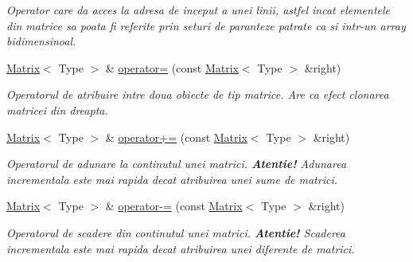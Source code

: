 \begin{DoxyCompactItemize}
\begin{DoxyCompactList}\small\item\em Operator care da acces la adresa de inceput a unei linii, astfel incat elementele din matrice sa poata fi referite prin seturi de paranteze patrate ca si intr-\/un array bidimensinoal. \end{DoxyCompactList}\item 
\hyperlink{classMatrix}{Matrix}$<$ Type $>$ \& \hyperlink{classMatrix_a1a1add9519f7b0665d7521d02ec812e8}{operator=} (const \hyperlink{classMatrix}{Matrix}$<$ Type $>$ \&right)
\begin{DoxyCompactList}\small\item\em Operatorul de atribuire intre doua obiecte de tip matrice. Are ca efect clonarea matricei din dreapta. \end{DoxyCompactList}\item 
\hyperlink{classMatrix}{Matrix}$<$ Type $>$ \& \hyperlink{classMatrix_ad1b43be070f29d447bd56e46faa533aa}{operator+=} (const \hyperlink{classMatrix}{Matrix}$<$ Type $>$ \&right)
\begin{DoxyCompactList}\small\item\em Operatorul de adunare la continutul unei matrici. {\bfseries Atentie!} Adunarea incrementala este mai rapida decat atribuirea unei sume de matrici. \end{DoxyCompactList}\item 
\hyperlink{classMatrix}{Matrix}$<$ Type $>$ \& \hyperlink{classMatrix_a3f8b8cab5fccc81ec96be09dce471f6c}{operator-\/=} (const \hyperlink{classMatrix}{Matrix}$<$ Type $>$ \&right)
\begin{DoxyCompactList}\small\item\em Operatorul de scadere din continutul unei matrici. {\bfseries Atentie!} Scaderea incrementala este mai rapida decat atribuirea unei diferente de matrici. \end{DoxyCompactList}\end{DoxyCompactItemize}
